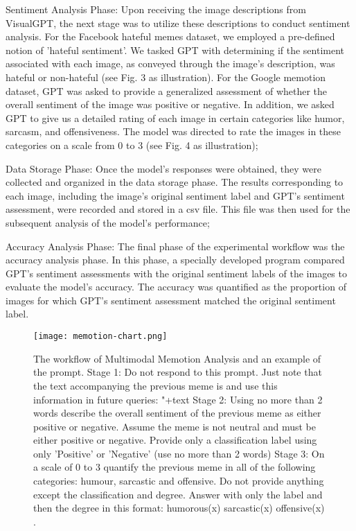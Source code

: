 \documentclass[conference]{IEEEtran}
\begin{document}
Sentiment Analysis Phase: Upon receiving the image descriptions from VisualGPT, the next stage was to utilize these descriptions to conduct sentiment analysis. For the Facebook hateful memes dataset, we employed a pre-defined notion of 'hateful sentiment'. We tasked GPT with determining if the sentiment associated with each image, as conveyed through the image's description, was hateful or non-hateful (see Fig. 3 as illustration). For the Google memotion dataset, GPT was asked to provide a generalized assessment of whether the overall sentiment of the image was positive or negative. In addition, we asked GPT to give us a detailed rating of each image in certain categories like humor, sarcasm, and offensiveness. The model was directed to rate the images in these categories on a scale from 0 to 3 (see Fig. 4 as illustration); 

Data Storage Phase: Once the model's responses were obtained, they were collected and organized in the data storage phase. The results corresponding to each image, including the image's original sentiment label and GPT's sentiment assessment, were recorded and stored in a csv file. This file was then used for the subsequent analysis of the model's performance; 

Accuracy Analysis Phase: The final phase of the experimental workflow was the accuracy analysis phase. In this phase, a specially developed program compared GPT's sentiment assessments with the original sentiment labels of the images to evaluate the model's accuracy. The accuracy was quantified as the proportion of images for which GPT's sentiment assessment matched the original sentiment label.

\begin{figure}[htbp]
\centerline{\texttt{[image: memotion-chart.png]}}
 \caption{The workflow of Multimodal Memotion Analysis and an example of the prompt. Stage 1:
Do not respond to this prompt. Just note that the text accompanying the previous meme is and use this information in future queries: "+text
Stage 2:
Using no more than 2 words describe the overall sentiment of the previous meme as either positive or negative. Assume the meme is not neutral and must be either positive or negative. Provide only a classification label using only 'Positive' or 'Negative' (use no more than 2 words)
Stage 3:
On a scale of 0 to 3 quantify the previous meme in all of the following categories: humour, sarcastic and offensive. Do not provide anything except the classification and degree. Answer with only the label and then the degree in this format: humorous(x) sarcastic(x) offensive(x)  .}

\end{figure}
\end{document}
